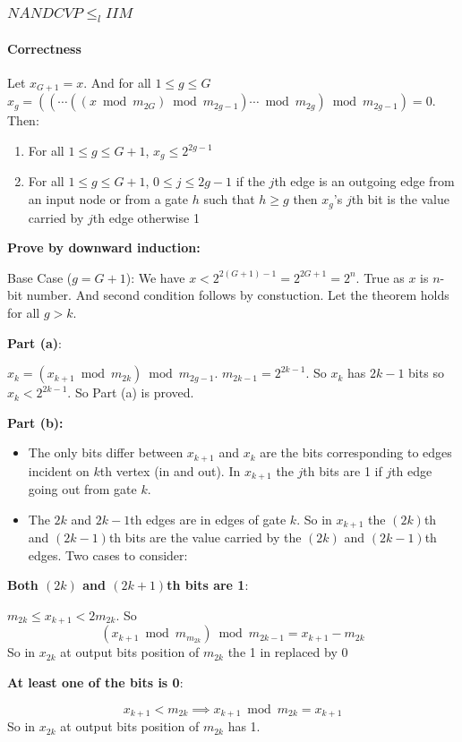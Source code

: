 \documentclass[article,10pt]{beamer}%
\begin{document}
\begin{frame}[allowframebreaks]
\frametitle{$NANDCVP\leq_l IIM$}
\framesubtitle{Correctness}
\begin{theorem}
	Let $x_{G+1}=x$. And for all $1\leq g\leq G$ $x_g=((\cdots ((x\bmod{m_{2G}})\bmod{m_{2g-1}})\cdots\bmod{m_{2g}})\bmod{m_{2g-1}})=0$. Then:\begin{enumerate}
		\item For all $1\leq g\leq G+1$, $x_g\leq 2^{2g-1}$
		\item For all $1\leq g\leq G+1$, $0\leq j\leq 2g-1$ if the $j$th edge is an outgoing edge from an input node or from a gate $h$ such that $h\geq g$ then $x_g$'s $j$th bit is the value carried by $j$th edge 		otherwise 1
	\end{enumerate}
\end{theorem}
\framebreak


\textbf{Prove by downward induction:}
\vspace{3mm}

 Base Case ($g=G+1$): We have $x< 2^{2(G+1)-1}=2^{2G+1}=2^{n}$. True as $x$ is $n$-bit number. And second condition follows by constuction.
Let the theorem holds for all $g>k$. \framebreak

\textbf{Part (a)}:

\hspace{0.5cm} $x_k=(x_{k+1}\bmod{m_{2k}})\bmod{m_{2g-1}}$. $m_{2k-1}=2^{2k-1}$. So $x_k$ has $2k-1$ bits so $ x_k<2^{2k-1}$. So Part (a) is proved.
\framebreak

\textbf{Part (b):}
\begin{itemize}
	\item The only bits differ between $x_{k+1}$ and $x_k$ are the bits corresponding to edges incident on $k$th vertex (in and out). In $x_{k+1}$ the $j$th bits are 1 if $j$th edge going out from gate $k$.
	\item The $2k$ and $2k-1$th edges are in edges of gate $k$. So in $x_{k+1}$ the $(2k)$th and $(2k-1)$th bits are the value carried by the $(2k)$ and $(2k-1)$th edges. Two cases to consider:
\end{itemize}
\framebreak

\textbf{Both $(2k)$ and $(2k+1)$th bits are 1}: 

$m_{2k}\leq x_{k+1}< 2m_{2k}$. So $$(x_{k+1}\bmod{m_{m_{2k}}})\bmod m_{2k-1}=x_{k+1}-m_{2k}$$ 
So in $x_{2k}$ at output bits position of $m_{2k}$  the 1 in replaced  by  $0$\vspace{2mm}

\textbf{At least one of the bits is 0}: 

$$x_{k+1}<m_{2k}\implies x_{k+1}\bmod{m_{2k}}=x_{k+1}$$ So in $x_{2k}$ at output bits position of $m_{2k}$  has 1.

\end{frame}
\end{document}
